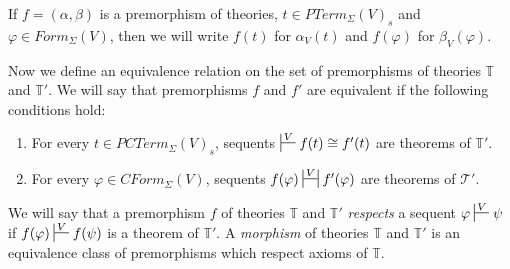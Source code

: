 \documentclass[reqno]{amsart}
\theoremstyle{definition}
\theoremstyle{remark}
\numberwithin{figure}{section}
\begin{document}
If $f = (\alpha,\beta)$ is a premorphism of theories, $t \in PTerm_\Sigma(V)_s$ and $\varphi \in Form_\Sigma(V)$,
then we will write $f(t)$ for $\alpha_V(t)$ and $f(\varphi)$ for $\beta_V(\varphi)$.

Now we define an equivalence relation on the set of premorphisms of theories $\mathbb{T}$ and $\mathbb{T}'$.
We will say that premorphisms $f$ and $f'$ are equivalent if the following conditions hold:
\begin{enumerate}
\item For every $t \in PCTerm_\Sigma(V)_s$, sequents $\sststile{}{V} f(t) \cong f'(t)$ are theorems of $\mathbb{T}'$.
\label{con-mor-eq-a}
\item For every $\varphi \in CForm_\Sigma(V)$, sequents $f(\varphi) \ssststile{}{V} f'(\varphi)$ are theorems of $\mathcal{T}'$.
\label{con-mor-eq-b}
\end{enumerate}

We will say that a premorphism $f$ of theories $\mathbb{T}$ and $\mathbb{T}'$ \emph{respects} a sequent $\varphi \sststile{}{V} \psi$
if $f(\varphi) \sststile{}{V} f(\psi)$ is a theorem of $\mathbb{T}'$.
A \emph{morphism} of theories $\mathbb{T}$ and $\mathbb{T}'$ is an equivalence class of premorphisms which respect axioms of $\mathbb{T}$.
\end{document}
